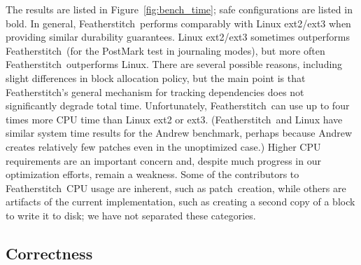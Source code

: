 \documentclass[9pt,twocolumn,letterpaper]{article}
\newcommand{\Kudos}{Featherstitch}
\newcommand{\patch}{patch}
\newcommand{\patches}{patches}
\begin{document}
The results are listed in
Figure~\ref{fig:bench_time};
%
safe configurations are listed in bold.
%
In general, \Kudos\ performs comparably with Linux
ext2/ext3 when providing similar durability guarantees. Linux
ext2/ext3 sometimes outperforms \Kudos\ (for the PostMark test in
journaling modes), but more often \Kudos\ outperforms Linux.  There are
several possible reasons, including slight differences in block allocation
policy, but the main point is that \Kudos's general mechanism for
tracking dependencies does not significantly degrade total time.
%
Unfortunately, 
\Kudos\ can use up to four times more CPU time than Linux ext2 or
ext3. (\Kudos\ and Linux have similar
system time results for the Andrew benchmark, perhaps because Andrew
creates relatively few patches even in the unoptimized case.)
%
%
Higher CPU requirements are an important concern and, despite much progress
in our optimization efforts, remain a weakness.
%
Some of the contributors to \Kudos\ CPU usage are inherent, such as
\patch\ creation, while others are artifacts of the current
implementation, such as creating a second copy of a block to write it to
disk; we have not separated these categories.
%
%
\begin{comment}
Further, while \Kudos\ I/O times are lower than Linux ext2/ext3 I/O
times for the untar and delete benchmarks, we have found that small
block allocation strategy changes can significantly affect I/O time
for many of these benchmarks. This further emphasizes the importance
of the system CPU time difference.
\end{comment}

\begin{comment}
Unlike the untar, delete, and Andrew benchmarks, Linux ext3 writeback
and journal modes outperform \Kudos\ meta journal and full journal
modes, respectively, at PostMark.
\end{comment}


\subsection {Correctness}
\label{sec:eval:correctness}
\end{document}
